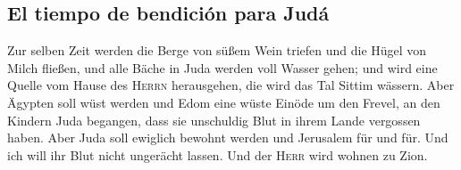 \hypertarget{el-tiempo-de-bendiciuxf3n-para-juduxe1}{%
\subsection{El tiempo de bendición para
Judá}\label{el-tiempo-de-bendiciuxf3n-para-juduxe1}}

 Zur selben Zeit werden die Berge von süßem Wein triefen
und die Hügel von Milch fließen, und alle Bäche in Juda werden voll
Wasser gehen; und wird eine Quelle vom Hause des \textsc{Herrn}
herausgehen, die wird das Tal Sittim wässern.  Aber
Ägypten soll wüst werden und Edom eine wüste Einöde um den Frevel, an
den Kindern Juda begangen, dass sie unschuldig Blut in ihrem Lande
vergossen haben.  Aber Juda soll ewiglich bewohnt werden
und Jerusalem für und für.  Und ich will ihr Blut nicht
ungerächt lassen. Und der \textsc{Herr} wird wohnen zu Zion.
